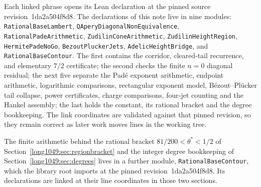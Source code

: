 \documentclass[11pt]{article}
\renewcommand{\commitshort}{1da2a504f8d8}
\begin{document}
Each linked phrase opens its Lean declaration at the pinned source
revision~\commitshort.  The declarations of this note live in nine modules:
\texttt{RationalBaseLambert}, \texttt{QAperyDiagonalNonEquivalence},
\texttt{RationalPadeArithmetic}, \texttt{ZudilinConeArithmetic},
\texttt{ZudilinHeightRegion}, \texttt{HermitePadeNoGo},
\texttt{BezoutPluckerJets}, \texttt{AdelicHeightBridge}, and
\texttt{RationalBaseContour}.  The first contains
the corridor, cleared-tail recurrence, and elementary $7/2$ certificate; the
second checks the finite $n=0$ diagonal residual; the next five separate
the Pad\'e exponent arithmetic, endpoint arithmetic, logarithmic comparisons,
rectangular exponent model, B\'ezout--Pl\"ucker tail collapse, power
certificates, charge comparisons, four-jet counting and the Hankel assembly;
the last holds the constant, its rational bracket and the degree bookkeeping.
The link
coordinates are validated against that pinned revision, so they remain correct
as later work moves lines in the working tree.

The finite arithmetic behind the rational bracket
$81/200<\theta^{*}<1/2$ of Section~\ref{long1049:sec:regionbracket} and the integer
degree bookkeeping of Section~\ref{long1049:sec:degrees} lives in a further module,
\texttt{RationalBaseContour}, which the library root imports at the pinned
revision~\commitshort.  Its declarations are linked at their line coordinates in
those two sections.

\iffalse
\end{document}
